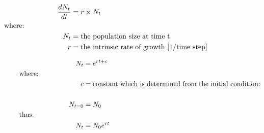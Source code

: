 \documentclass[12pt]{article}
\begin{document}
\begin{align}
\dfrac{dN_{t}}{dt} & = r\times N_{t} \nonumber \\
&    \hspace{-1.3in}  \text{where:} \nonumber \\
N_{t} & = \text{the population size at time t} \nonumber \\
r & = \text{the intrinsic rate of growth [1/time step]} \nonumber
\end{align} 

\begin{align}
 \hspace{1.3in} N_{t} &= {e}^{rt+c}  \nonumber \\
  &    \hspace{-1.3in}  \text{where:} \nonumber \\
c & = \text{constant which is determined from the initial condition:} \nonumber\\
\nonumber\\
\hspace{1.3in} N_{t=0} &= N_{0} \nonumber \\
&    \hspace{-1.3in}  \text{thus:} \nonumber \\
N_{t} & = N_{0}{e}^{rt} \nonumber
\end{align}
\end{document}
